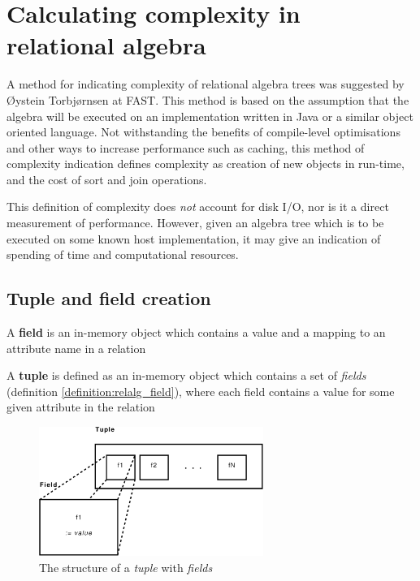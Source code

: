 \section{Calculating complexity in relational algebra}
\label{sect:method:complexity}
A method for indicating complexity of relational algebra trees was suggested
by \O ystein Torbj\o rnsen at FAST. This method is based on the assumption
that the algebra will be executed on an implementation written in Java or a
similar object oriented language. Not withstanding the
benefits of compile-level optimisations and other ways to increase performance
such as caching, this method of complexity indication defines complexity as
creation of new objects in run-time, and the cost of sort and join operations.

This definition of complexity does \textit{not} account
for disk I/O, nor is it a direct measurement of performance. However, given
an algebra tree which is to be executed on some known host implementation, it
may give an indication of spending of time and computational resources.

\subsection{Tuple and field creation}

\begin{myDefinition}
A \textbf{field} is an in-memory object which contains a value and a mapping to
an attribute name in a relation
\label{definition:relalg_field}
\end{myDefinition}

\begin{myDefinition}
A \textbf{tuple} is defined as an in-memory object which contains a set of
\textit{fields} (definition \ref{definition:relalg_field}), where each field
contains a value for some given attribute in the relation
\label{definition:relalg_tuple}
\end{myDefinition}

\begin{figure}[!htp]
\begin{center}
  \includegraphics[width=0.65\textwidth]{diagrams/tuple_post}
  \caption[Tuple/Field structure]{The structure of a \textit{tuple} with
  \textit{fields}}
  \label{fig:method:tuple_field}
\end{center}
\end{figure}

